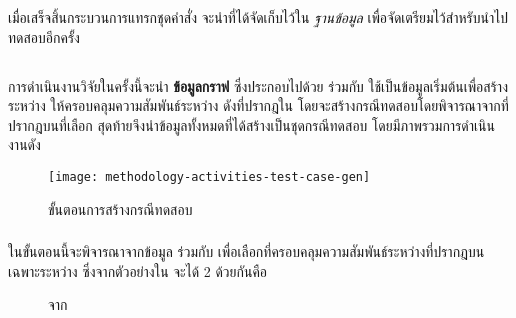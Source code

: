 เมื่อเสร็จสิ้นกระบวนการแทรกชุดคำสั่ง จะนำ{\sourcecode}ที่ได้จัดเก็บไว้ใน {\it ฐานข้อมูล} เพื่อจัดเตรียมไว้สำหรับนำไปทดสอบอีกครั้ง

\subsection{\testcaseGeneration}
\label{sec:sub:tcg}

การดำเนินงานวิจัยในครั้งนี้จะนำ {\bf ข้อมูลกราฟ} ซึ่งประกอบไปด้วย {\it {\scg}} ร่วมกับ{\it {\cfg}} ใช้เป็นข้อมูลเริ่มต้นเพื่อสร้าง{\TestPath}
ระหว่าง{\CUT} ให้ครอบคลุมความสัมพันธ์ระหว่าง{\class} ดังที่ปรากฎใน{\scg} โดยจะสร้างกรณีทดสอบโดยพิจารณาจาก{\PredicateNode}ที่ปรากฎบน{\TestPath}ที่เลือก 
สุดท้ายจึงนำข้อมูลทั้งหมดที่ได้สร้างเป็นชุดกรณีทดสอบ โดยมีภาพรวมการดำเนินงานดัง 

\begin{figure}[ht!]
    \centering
    \texttt{[image: methodology-activities-test-case-gen]}
    \caption{ขั้นตอนการสร้างกรณีทดสอบ}
    \label{fig:testcaseGenerationActivity}
\end{figure}

\subsubsection{\testpathSelection}

ในขั้นตอนนี้จะพิจารณาจากข้อมูล{\it \scg} ร่วมกับ {\it \cfg} เพื่อเลือก{\TestPath}ที่ครอบคลุมความสัมพันธ์ระหว่าง{\class}ที่ปรากฎบน{\scg} 
เฉพาะระหว่าง{\CUT} ซึ่งจาก{\scg}ตัวอย่างใน จะได้{\TestPath} 2 {\Path} ด้วยกันคือ

\begin{figure}[ht!]
    \centering
    \caption{{\TestPath}จาก{\scg}}
    \label{fig:testPathFromSCG}
\end{figure}

